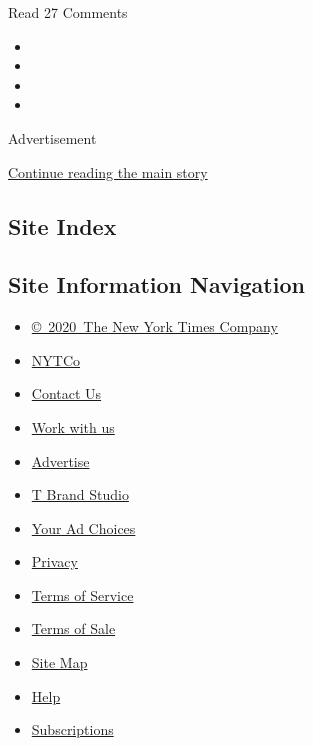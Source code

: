 Read 27 Comments

\begin{itemize}
\item
\item
\item
\item
\end{itemize}

Advertisement

\protect\hyperlink{after-bottom}{Continue reading the main story}

\hypertarget{site-index}{%
\subsection{Site Index}\label{site-index}}

\hypertarget{site-information-navigation}{%
\subsection{Site Information
Navigation}\label{site-information-navigation}}

\begin{itemize}
\tightlist
\item
  \href{https://help.nytimes3xbfgragh.onion/hc/en-us/articles/115014792127-Copyright-notice}{©~2020~The
  New York Times Company}
\end{itemize}

\begin{itemize}
\tightlist
\item
  \href{https://www.nytco.com/}{NYTCo}
\item
  \href{https://help.nytimes3xbfgragh.onion/hc/en-us/articles/115015385887-Contact-Us}{Contact
  Us}
\item
  \href{https://www.nytco.com/careers/}{Work with us}
\item
  \href{https://nytmediakit.com/}{Advertise}
\item
  \href{http://www.tbrandstudio.com/}{T Brand Studio}
\item
  \href{https://www.nytimes3xbfgragh.onion/privacy/cookie-policy\#how-do-i-manage-trackers}{Your
  Ad Choices}
\item
  \href{https://www.nytimes3xbfgragh.onion/privacy}{Privacy}
\item
  \href{https://help.nytimes3xbfgragh.onion/hc/en-us/articles/115014893428-Terms-of-service}{Terms
  of Service}
\item
  \href{https://help.nytimes3xbfgragh.onion/hc/en-us/articles/115014893968-Terms-of-sale}{Terms
  of Sale}
\item
  \href{https://spiderbites.nytimes3xbfgragh.onion}{Site Map}
\item
  \href{https://help.nytimes3xbfgragh.onion/hc/en-us}{Help}
\item
  \href{https://www.nytimes3xbfgragh.onion/subscription?campaignId=37WXW}{Subscriptions}
\end{itemize}
